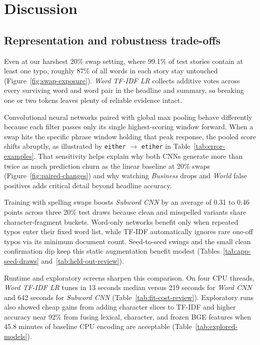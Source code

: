 \chapter{Discussion}\label{ch:discussion}

\section{Representation and robustness trade-offs}
Even at our harshest 20\% swap setting, where 99.1\% of test stories contain at least one typo, roughly 87\% of all words in each story stay untouched (Figure~\ref{fig:swap-exposure}). \textit{Word TF-IDF LR} collects additive votes across every surviving word and word pair in the headline and summary, so breaking one or two tokens leaves plenty of reliable evidence intact.

Convolutional neural networks paired with global max pooling behave differently because each filter passes only its single highest-scoring window forward. When a swap hits the specific phrase window holding that peak response, the pooled score shifts abruptly, as illustrated by \texttt{either} $\to$ \texttt{etiher} in Table~\ref{tab:error-examples}. That sensitivity helps explain why both CNNs generate more than twice as much prediction churn as the linear baseline at 20\% swaps (Figure~\ref{fig:paired-changes}) and why watching \emph{Business} drops and \emph{World} false positives adds critical detail beyond headline accuracy.

Training with spelling swaps boosts \textit{Subword CNN} by an average of 0.31 to 0.46 points across three 20\% test draws because clean and misspelled variants share character-fragment buckets. Word-only networks benefit only when repeated typos enter their fixed word list, while TF-IDF automatically ignores rare one-off typos via its minimum document count. Seed-to-seed swings and the small clean confirmation dip keep this static augmentation benefit modest (Tables~\ref{tab:app-seed-draws} and~\ref{tab:held-out-review}).

Runtime and exploratory screens sharpen this comparison. On four CPU threads, \textit{Word TF-IDF LR} tunes in 13 seconds median versus 219 seconds for \textit{Word CNN} and 642 seconds for \textit{Subword CNN} (Table~\ref{tab:fit-cost-review}). Exploratory runs also showed cheap gains from adding character slices to TF-IDF and higher accuracy near 92\% from fusing lexical, character, and frozen BGE features when 45.8 minutes of baseline CPU encoding are acceptable (Table~\ref{tab:explored-models}).

